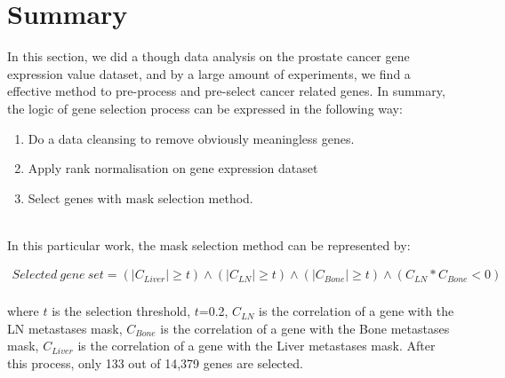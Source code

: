 \documentclass[12pt,a4paper]{report}
\begin{document}
\section{Summary}

In this section, we did a though data analysis on the prostate cancer gene expression value dataset, and by a large amount of experiments, we find a effective method to pre-process and pre-select cancer related genes.
In summary, the logic of gene selection process can be expressed in the following way:  

\begin{enumerate}[\hspace{3em}a.]
\item Do a data cleansing to remove obviously meaningless genes.
\item Apply rank normalisation on gene expression dataset
\item Select genes with mask selection method.
\end{enumerate}\\

In this particular work, the mask selection method can be represented by:

\begin{gather*} 
	    Selected \ gene \ set =  (\lvert C_{Liver}\rvert \geqslant t)\wedge (\lvert C_{LN}\rvert \geqslant t) \wedge (\lvert C_{Bone}\rvert \geqslant t) \wedge (C_{LN}*C_{Bone} < 0)
\end{gather*}\\



where $t$ is the selection threshold, $t$=0.2,  $C_{LN}$ is the correlation of a gene with the LN metastases mask, $C_{Bone}$ is the correlation of a gene with the Bone metastases mask,  $C_{Liver}$ is the correlation of a gene with the Liver metastases mask. After this process, only 133 out of 14,379 genes are selected. 
\end{document}
